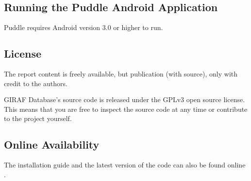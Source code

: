\subsection{Running the Puddle Android Application}
Puddle requires Android version 3.0 or higher to run.

\subsection{License}
The report content is freely available, but publication (with source), only with credit to the authors.

GIRAF Database's source code is released under the GPLv3 \cite{GNUlicense} open source license. This means that you are free to inspect the source code at any time or contribute to the project yourself.

\subsection*{Online Availability} The installation guide and the latest version of the code can also be found online \cite{install}.